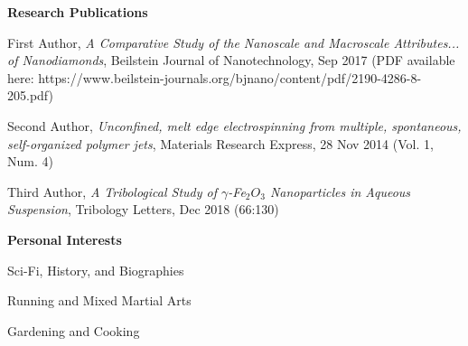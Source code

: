 \documentclass[letterpaper,final]{memoir}
\newcommand{\Sep}{\vspace{1.0em}}
\newcommand{\SmallSep}{\vspace{0.4em}}
\newcommand{\CVSection}[1]
	{\LARGE\textbf{#1}\par
	\SmallSep\normalsize}
\begin{document}

\notoserif \CVSection{Research Publications}
\normalfont

\SmallSep

\begin{compactitem}[\color{Blue}$\circ$]
	 
    \item First Author, \textit{A Comparative Study of the Nanoscale and Macroscale Attributes... of Nanodiamonds}, Beilstein Journal of Nanotechnology, Sep 2017 (PDF available here: https://www.beilstein-journals.org/bjnano/content/pdf/2190-4286-8-205.pdf)
    \SmallSep

    \item Second Author, \textit{Unconfined, melt edge electrospinning from multiple, spontaneous, self-organized polymer jets}, Materials Research Express, 28 Nov 2014 (Vol. 1, Num. 4)
    \SmallSep

    \item Third Author, \textit{A Tribological Study of $\gamma$-Fe$_{2}O_{3}$ Nanoparticles in Aqueous Suspension}, Tribology Letters, Dec 2018 (66:130)
	
\end{compactitem}

\Sep
\notoserif \CVSection{Personal Interests}
\normalfont

\begin{multicols}{3}
	\begin{compactitem}
		
		\item Sci-Fi, History, and Biographies
		\item Running and Mixed Martial Arts
        \item Gardening and Cooking
			
	\end{compactitem}
\end{multicols}
\end{document}
